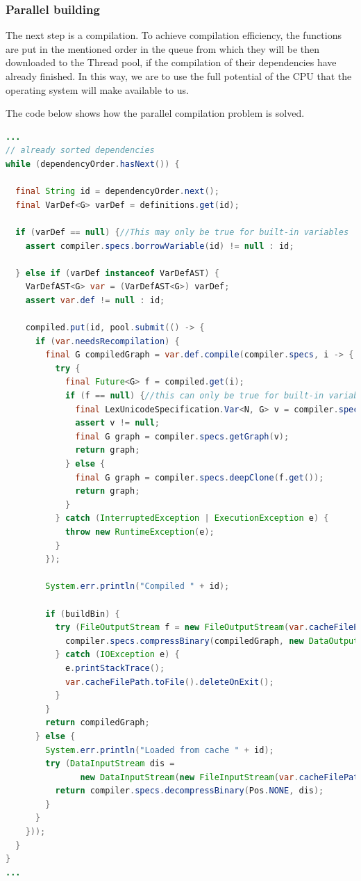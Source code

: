 \hypertarget{parallel-building}{%
\subsubsection{Parallel building}\label{parallel-building}}

The next step is a compilation. To achieve compilation efficiency, the
functions are put in the mentioned order in the queue from which they
will be then downloaded to the Thread pool, if the compilation of their
dependencies have already finished. In this way, we are to use the full
potential of the CPU that the operating system will make available to
us.

The code below shows how the parallel compilation problem is solved.

\begin{lstlisting}[language=Java, frame=single]
...
// already sorted dependencies
while (dependencyOrder.hasNext()) {

  final String id = dependencyOrder.next();
  final VarDef<G> varDef = definitions.get(id);

  if (varDef == null) {//This may only be true for built-in variables
    assert compiler.specs.borrowVariable(id) != null : id;

  } else if (varDef instanceof VarDefAST) {
    VarDefAST<G> var = (VarDefAST<G>) varDef;
    assert var.def != null : id;

    compiled.put(id, pool.submit(() -> {
      if (var.needsRecompilation) {
        final G compiledGraph = var.def.compile(compiler.specs, i -> {
          try {
            final Future<G> f = compiled.get(i);
            if (f == null) {//this can only be true for built-in variables
              final LexUnicodeSpecification.Var<N, G> v = compiler.specs.copyVariable(i);
              assert v != null;
              final G graph = compiler.specs.getGraph(v);
              return graph;
            } else {
              final G graph = compiler.specs.deepClone(f.get());
              return graph;
            }
          } catch (InterruptedException | ExecutionException e) {
            throw new RuntimeException(e);
          }
        });

        System.err.println("Compiled " + id);

        if (buildBin) {
          try (FileOutputStream f = new FileOutputStream(var.cacheFilePath.toFile())) {
            compiler.specs.compressBinary(compiledGraph, new DataOutputStream(f));
          } catch (IOException e) {
            e.printStackTrace();
            var.cacheFilePath.toFile().deleteOnExit();
          }
        }
        return compiledGraph;
      } else {
        System.err.println("Loaded from cache " + id);
        try (DataInputStream dis =
               new DataInputStream(new FileInputStream(var.cacheFilePath.toFile()))) {
          return compiler.specs.decompressBinary(Pos.NONE, dis);
        }
      }
    }));
  }
}
...
\end{lstlisting}

